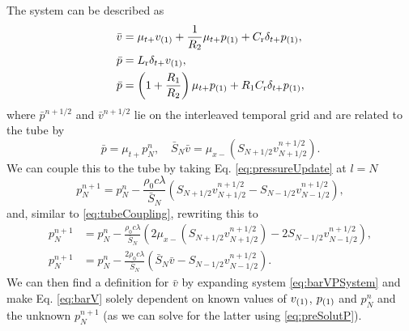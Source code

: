 {The system can be described as
\begin{subequations}\label{eq:barVPSystem}
    \begin{align}
        \bar v &= \mu_{t+}v_{(1)} + \frac{1}{R_2}\mu_{t+}p_{(1)} + C_{\text{r}} \delta_{t+}p_{(1)},\label{eq:barV}\\
        \bar p &= L_{\text{r}} \delta_{t+}v_{(1)},\label{eq:barP1}\\
        \bar p &= \left(1+\frac{R_1}{R_2}\right)\mu_{t+}p_{(1)}+ R_1 C_{\text{r}}\delta_{t+}p_{(1)}\label{eq:barP2},
    \end{align}
\end{subequations}
where $\bar p^{n+1/2}$ and $\bar v^{n+1/2}$ lie on the interleaved temporal grid and are related to the tube by
\begin{equation}\label{eq:barVars}
    \bar p = \mu_{t+}p^n_N, \quad \bar S_N \bar v = \mu_{x-}\left(S_{N+1/2}v_{N+1/2}^{n+1/2}\right).
\end{equation}
We can couple this to the tube by taking Eq. \eqref{eq:pressureUpdate} at $l = N$
\begin{equation}
    p_N^{n+1} = p_N^n - \frac{\rho_0 c \lambda}{\bar{S}_N}\left(S_{N+1/2}v_{N+1/2}^{n+1/2}-S_{N-1/2}v_{N-1/2}^{n+1/2}\right),
\end{equation}
and, similar to \eqref{eq:tubeCoupling}, rewriting this to 
\begin{align}
    p_N^{n+1} &= p_N^n - \frac{\rho_0 c \lambda}{\bar{S}_N}\left(2\mu_{x-}\left(S_{N+1/2}v_{N+1/2}^{n+1/2}\right)-2S_{N-1/2}v_{N-1/2}^{n+1/2}\right)\nonumber,\\
    p_N^{n+1} &= p_N^n - \frac{2\rho_0 c \lambda}{\bar{S}_N}\left(\bar S_N \bar v-S_{N-1/2}v_{N-1/2}^{n+1/2}\right)\label{eq:preSolutP}.
\end{align}
We can then find a definition for $\bar v$ by expanding system \eqref{eq:barVPSystem} and make Eq. \eqref{eq:barV} solely dependent on known values of $v_{(1)}$, $p_{(1)}$ and $p_N^n$ and the unknown $p_N^{n+1}$ (as we can solve for the latter using \eqref{eq:preSolutP}).

}
